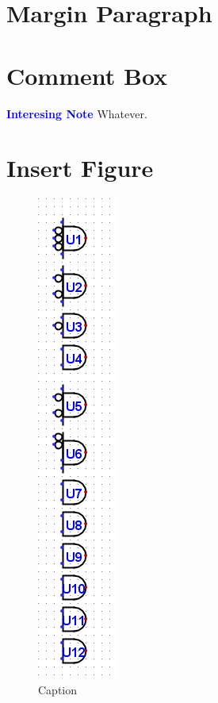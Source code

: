 \section{Margin Paragraph} 

\section{Comment Box}
\begin{tcolorbox}[colback=blue!5!white,colframe=blue!75!black]
	\textcolor{blue}{\textbf{Interesing Note}}
	\tcblower
	Whatever.
\end{tcolorbox}

\section{Insert Figure}
\begin{figure}[H]
	\centering
	\includegraphics[width=\maxwidth{.95\linewidth}]{gfx/03-01}
	\caption{Caption}
	\label{fig:03-01}
\end{figure}

